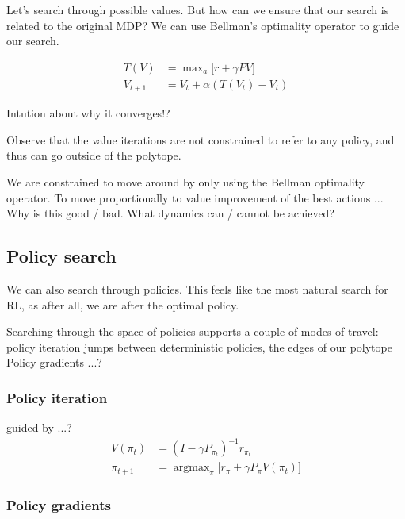 Let's search through possible values. But how can we ensure that our search is
related to the original MDP? We can use Bellman's optimality operator to guide our search.


\begin{align}
T(V) &= \mathop{\text{max}}_a \big[r + \gamma PV\big] \\
V_{t+1} &= V_t + \alpha (T(V_t) - V_t)
\end{align}

Intution about why it converges!?


Observe that the value iterations are not constrained to refer to any policy,
and thus can go outside of the polytope. \cite{Dadashi2018}

We are constrained to move around by only using the Bellman optimality operator.
To move proportionally to value improvement of the best actions ...
Why is this good / bad. What dynamics can / cannot be achieved?

\subsection{Policy search}

We can also search through policies. This feels like the most natural search for RL,
as after all, we are after the optimal policy.

Searching through the space of policies supports a couple of modes of travel:
policy iteration jumps between deterministic policies, the edges of our polytope
Policy gradients ...?

\subsubsection{Policy iteration}

guided by ...?
\begin{align}
V(\pi_t) &=  (I - \gamma P_{\pi_t})^{-1} r_{\pi_t} \\
\pi_{t+1} &= \mathop{\text{argmax}}_\pi \big[r_{\pi} + \gamma P_{\pi}V(\pi_t) \big]
\end{align}


\subsubsection{Policy gradients}

